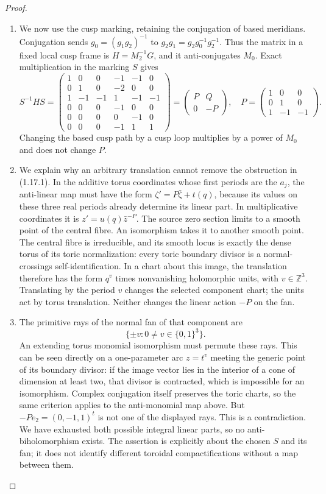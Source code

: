 \begin{proof}
\begin{enumerate}[label=\arabic*.]
\item We now use the cusp marking, retaining the conjugation of based
meridians.  Conjugation sends
$g_0=(g_1g_2)^{-1}$ to $g_2g_1=g_2g_0^{-1}g_2^{-1}$.
Thus the matrix in a fixed local cusp frame is
$H=M_2^{-1}G$, and it anti-conjugates $M_0$.
Exact multiplication in the marking $S$ gives
\[
S^{-1}HS=
\begin{pmatrix}
1&0&0&-1&-1&0\\
0&1&0&-2&0&0\\
1&-1&-1&1&-1&-1\\
0&0&0&-1&0&0\\
0&0&0&0&-1&0\\
0&0&0&-1&1&1
\end{pmatrix}
=\begin{pmatrix}P&Q\\0&-P\end{pmatrix},\quad
P=\begin{pmatrix}1&0&0\\0&1&0\\1&-1&-1\end{pmatrix}.
\tag{1.17.1}
\]
Changing the based cusp path by a cusp loop multiplies by a power of
$M_0$ and does not change $P$.

\item We explain why an arbitrary translation cannot remove the obstruction
in (1.17.1).  In the additive torus coordinates whose first periods
are the $a_j$, the anti-linear map must have the form
$\zeta' =P\bar\zeta+t(q)$, because its values on these three real
periods already determine its linear part.  In multiplicative
coordinates it is
$z'=u(q)\bar z^{-P}$.
The source zero section limits to a smooth point of the central fibre.
An isomorphism takes it to another smooth point.  The central fibre
is irreducible, and its smooth locus is exactly the dense torus of
its toric normalization: every toric boundary divisor is a
normal-crossings self-identification.  In a chart about this image,
the translation therefore has the form $q^v$ times nonvanishing
holomorphic units, with $v\in\mathbb Z^3$.  Translating by the period
$v$ changes the selected component chart; the units act by torus
translation.  Neither changes the linear action $-P$ on the fan.

\item The primitive rays of the normal fan of that component are
\[
\{\pm v:0\ne v\in\{0,1\}^3\}.
\]
An extending torus monomial isomorphism must permute these rays.
This can be seen directly on a one-parameter arc $z=t^v$ meeting the
generic point of its boundary divisor: if the image vector lies in
the interior of a cone of dimension at least two, that divisor is
contracted, which is impossible for an isomorphism.  Complex
conjugation itself preserves the toric charts, so the same criterion
applies to the anti-monomial map above.
But $-Pe_2=(0,-1,1)^t$ is not one of the displayed rays.
This is a contradiction.  We have exhausted both possible integral
linear parts, so no anti-biholomorphism exists.
The assertion is explicitly about the chosen $S$ and its fan; it does
not identify different toroidal compactifications without a map
between them.


\end{enumerate}
\end{proof}
